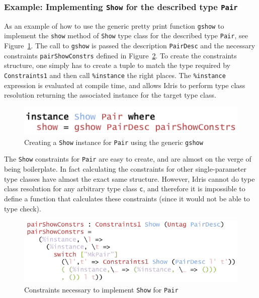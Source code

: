 \documentclass{ituthesis}
\newcommand{\tttype}[1]{\textcolor{type-color}{\texttt{#1}}}
\newcommand{\ttdec}[1]{\textcolor{declared-var-color}{\texttt{#1}}}
\newcommand{\ttvar}[1]{\textcolor{local-var-color}{\texttt{#1}}}
\newcommand{\ttliteral}[1]{\textcolor{literal-color}{\texttt{#1}}}
\theoremstyle{break}
\begin{document}
\subsubsection{Example: Implementing \tttype{Show} for the described type \ttdec{Pair}}
\label{ssub:Example:ImplementingShowforPairs}
As an example of how to use the generic pretty print function \ttdec{gshow} to implement the \ttdec{show} method of \tttype{Show} type class for the described type \ttdec{Pair}, see Figure~\ref{fig:showinst}.
The call to \ttdec{gshow} is passed the description \ttdec{PairDesc} and the necessary constraints \ttdec{pairShowConstrs} defined in Figure~\ref{fig:showconstrs}.
To create the constraints structure, one simply has to create a tuple to match the type required by \ttdec{Constraints1} and then call \ttliteral{\%instance} the right places.
The \ttliteral{\%instance} expression is evaluated at compile time, and allows Idris to perform type class resolution returning the associated instance for the target type class.

\begin{figure}[ht]
\begin{center}
    \includegraphics[scale=0.5]{Figures/GenericShowInstance.png}
\end{center}
\caption{Creating a \tttype{Show} instance for \ttdec{Pair} using the generic \ttdec{gshow}}
\label{fig:showinst}
\end{figure}

The \tttype{Show} constraints for \ttdec{Pair} are easy to create, and are almost on the verge of being boilerplate.
In fact calculating the constraints for other single-parameter type classes have almost the exact same structure.
However, Idris cannot do type class resolution for any arbitrary type class \ttvar{c}, and therefore it is impossible to define a function that calculates these constraints (since it would not be able to type check).

\begin{figure}[ht]
\begin{center}
    \includegraphics[scale=0.5]{Figures/GenericShowConstraints.png}
\end{center}
\caption{Constraints necessary to implement \tttype{Show} for \ttdec{Pair}}
\label{fig:showconstrs}
\end{figure}
\end{document}
